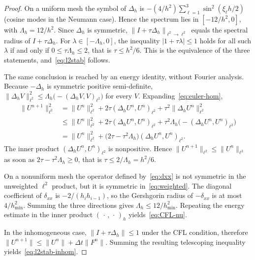 \documentclass[final,3p,times]{elsarticle}
\theoremstyle{plain}
\theoremstyle{definition}
\theoremstyle{remark}
\begin{document}
\begin{proof}
On a uniform mesh the symbol of $\Delta_h$ is
$-(4/h^2)\sum_{\ell=1}^3\sin^2(\xi_\ell h/2)$ (cosine modes in the Neumann
case). Hence the spectrum lies in $[-12/h^2,0]$, with $\Lambda_h=12/h^2$.
Since $\Delta_h$ is symmetric, $\lVert I+\tau\Delta_h\rVert_{\ell^2\to\ell^2}$
equals the spectral radius of $I+\tau\Delta_h$. For $\lambda\in[-\Lambda_h,0]$,
the inequality $\lvert 1+\tau\lambda\rvert\le 1$ holds for all such $\lambda$
if and only if $0\le\tau\Lambda_h\le 2$, that is $\tau\le h^2/6$. This is
the equivalence of the three statements, and~\eqref{eq:l2stab} follows.

The same conclusion is reached by an energy identity, without Fourier
analysis. Because $-\Delta_h$ is symmetric positive semi-definite,
$\lVert\Delta_h V\rVert_{\ell^2}^2\le\Lambda_h\bigl(-(\Delta_h V,V)_{\ell^2}\bigr)$
for every $V$. Expanding~\eqref{eq:euler-hom},
\begin{equation}
\begin{aligned}
\lVert U^{n+1}\rVert_{\ell^2}^2
&=\lVert U^n\rVert_{\ell^2}^2
+2\tau(\Delta_h U^n,U^n)_{\ell^2}
+\tau^2\lVert\Delta_h U^n\rVert_{\ell^2}^2 \\
&\le
\lVert U^n\rVert_{\ell^2}^2
+2\tau(\Delta_h U^n,U^n)_{\ell^2}
+\tau^2\Lambda_h\bigl(-(\Delta_h U^n,U^n)_{\ell^2}\bigr) \\
&=\lVert U^n\rVert_{\ell^2}^2
+\bigl(2\tau-\tau^2\Lambda_h\bigr)(\Delta_h U^n,U^n)_{\ell^2}.
\end{aligned}
\end{equation}
The inner product $(\Delta_h U^n,U^n)_{\ell^2}$ is nonpositive. Hence
$\lVert U^{n+1}\rVert_{\ell^2}\le\lVert U^n\rVert_{\ell^2}$ as soon as
$2\tau-\tau^2\Lambda_h\ge 0$, that is $\tau\le 2/\Lambda_h=h^2/6$.

On a nonuniform mesh the operator defined by~\eqref{eq:dxx} is not symmetric
in the unweighted $\ell^2$ product, but it is symmetric in~\eqref{eq:weighted}.
The diagonal coefficient of $\delta_{xx}$ is $-2/(h_i h_{i-1})$, so the
Gershgorin radius of $-\delta_{xx}$ is at most $4/h_{\min}^2$. Summing the
three directions gives $\Lambda_h\le 12/h_{\min}^2$. Repeating the energy
estimate in the inner product $(\,\cdot\,,\,\cdot\,)_h$ yields~\eqref{eq:CFL-nu}.

In the inhomogeneous case, $\lVert I+\tau\Delta_h\rVert\le 1$ under the CFL
condition, therefore $\lVert U^{n+1}\rVert\le\lVert U^n\rVert+\Delta t\lVert F^n\rVert$.
Summing the resulting telescoping inequality yields~\eqref{eq:l2stab-inhom}.
\end{proof}
\end{document}
